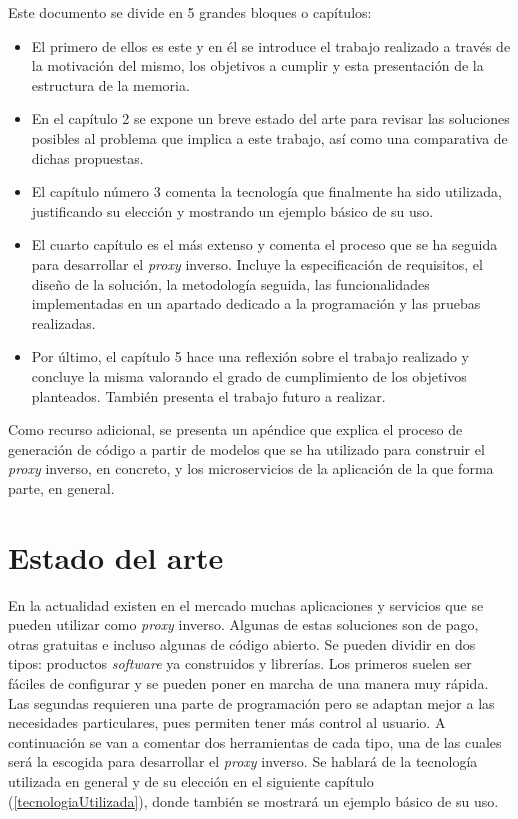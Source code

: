 \documentclass[11pt,spanish,listoffigures]{tfgetsinf}
\begin{document}
Este documento se divide en 5 grandes bloques o capítulos:

\begin{itemize}

	\item El primero de ellos es este y en él se introduce el trabajo realizado a través de la motivación del mismo, los objetivos a cumplir y esta presentación de la estructura de la memoria.

	\item En el capítulo 2 se expone un breve estado del arte para revisar las soluciones posibles al problema que implica a este trabajo, así como una comparativa de dichas propuestas.

	\item El capítulo número 3 comenta la tecnología que finalmente ha sido utilizada, justificando su elección y mostrando un ejemplo básico de su uso.

	\item El cuarto capítulo es el más extenso y comenta el proceso que se ha seguida para desarrollar el \emph{proxy} inverso. Incluye la especificación de requisitos, el diseño de la solución, la metodología seguida, las funcionalidades implementadas en un apartado dedicado a la programación y las pruebas realizadas.

	\item Por último, el capítulo 5 hace una reflexión sobre el trabajo realizado y concluye la misma valorando el grado de cumplimiento de los objetivos planteados. También presenta el trabajo futuro a realizar.

\end{itemize}

Como recurso adicional, se presenta un apéndice que explica el proceso de generación de código a partir de modelos que se ha utilizado para construir el \emph{proxy} inverso, en concreto, y los microservicios de la aplicación de la que forma parte, en general.


\chapter{Estado del arte}

En la actualidad existen en el mercado muchas aplicaciones y servicios que se pueden utilizar como \emph{proxy} inverso. Algunas de estas soluciones son de pago, otras gratuitas e incluso algunas de código abierto. Se pueden dividir en dos tipos: productos \emph{software} ya construidos y librerías. Los primeros suelen ser fáciles de configurar y se pueden poner en marcha de una manera muy rápida. Las segundas requieren una parte de programación pero se adaptan mejor a las necesidades particulares, pues permiten tener más control al usuario. A continuación se van a comentar dos herramientas de cada tipo, una de las cuales será la escogida para desarrollar el \emph{proxy} inverso. Se hablará de la tecnología utilizada en general y de su elección en el siguiente capítulo (\ref{tecnologiaUtilizada}), donde también se mostrará un ejemplo básico de su uso.
\end{document}
